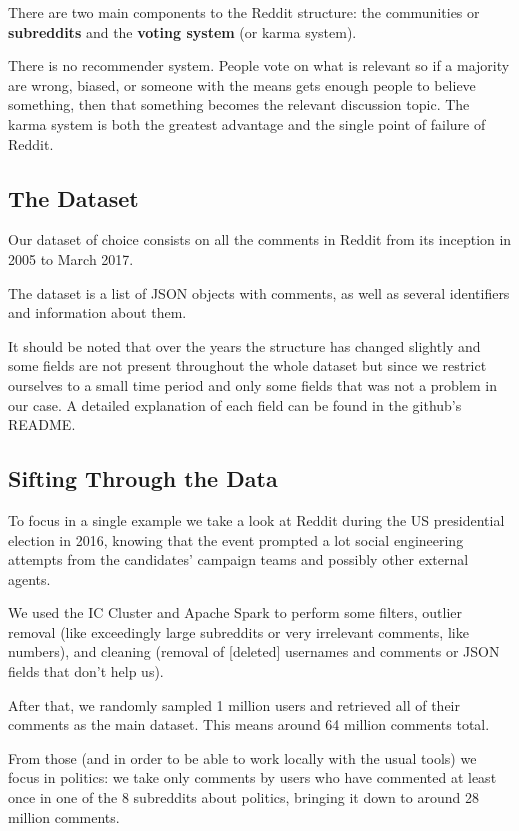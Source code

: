 \documentclass[11pt]{article}
\begin{document}
There are two main components to the Reddit structure: the communities or \textbf{subreddits} and the \textbf{voting system} (or karma system).

There is no recommender system. People vote on what is relevant so if a majority are wrong, biased, or someone with the means gets enough people to believe something, then that something becomes the relevant discussion topic. The karma system is both the greatest advantage and the single point of failure of Reddit.

\subsection{The Dataset}

Our dataset of choice consists on all the comments in Reddit from its inception in 2005 to March 2017.

The dataset is a list of JSON objects with comments, as well as several identifiers and information about them.

It should be noted that over the years the structure has changed slightly and some fields are not present throughout the whole dataset but since we restrict ourselves to a small time period and only some fields that was not a problem in our case.
A detailed explanation of each field can be found in the github's README.

\subsection{Sifting Through the Data}

To focus in a single example we take a look at Reddit during the US presidential election in 2016, knowing that the event prompted a lot social engineering attempts from the candidates' campaign teams and possibly other external agents. 

We used the IC Cluster and Apache Spark to perform some filters, outlier removal (like exceedingly large subreddits or very irrelevant comments, like numbers), and cleaning (removal of [deleted] usernames and comments or JSON fields that don't help us).

After that, we randomly sampled 1 million users and retrieved all of their comments as the main dataset. This means around 64 million comments total.

From those (and in order to be able to work locally with the usual tools) we focus in politics: we take only comments by users who have commented at least once in one of the 8 subreddits about politics, bringing it down to around 28 million comments.
\end{document}
